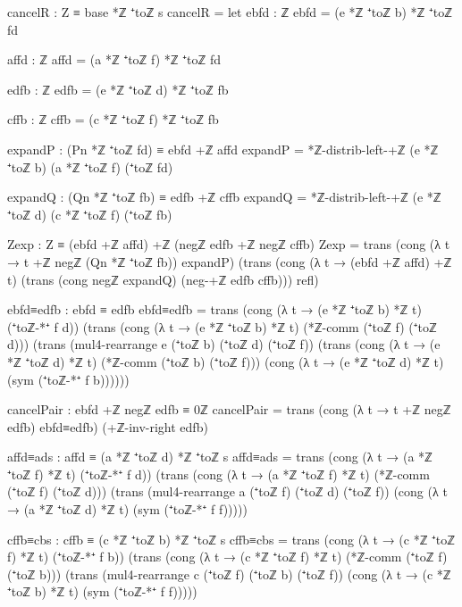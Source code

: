 \documentclass[11pt,a4paper]{book}
\begin{document}
\begin{code}
    cancelR : Z ≡ base *ℤ ⁺toℤ s
    cancelR =
      let
        ebfd : ℤ
        ebfd = (e *ℤ ⁺toℤ b) *ℤ ⁺toℤ fd

        affd : ℤ
        affd = (a *ℤ ⁺toℤ f) *ℤ ⁺toℤ fd

        edfb : ℤ
        edfb = (e *ℤ ⁺toℤ d) *ℤ ⁺toℤ fb

        cffb : ℤ
        cffb = (c *ℤ ⁺toℤ f) *ℤ ⁺toℤ fb

        expandP : (Pn *ℤ ⁺toℤ fd) ≡ ebfd +ℤ affd
        expandP = *ℤ-distrib-left-+ℤ (e *ℤ ⁺toℤ b) (a *ℤ ⁺toℤ f) (⁺toℤ fd)

        expandQ : (Qn *ℤ ⁺toℤ fb) ≡ edfb +ℤ cffb
        expandQ = *ℤ-distrib-left-+ℤ (e *ℤ ⁺toℤ d) (c *ℤ ⁺toℤ f) (⁺toℤ fb)

        Zexp : Z ≡ (ebfd +ℤ affd) +ℤ (negℤ edfb +ℤ negℤ cffb)
        Zexp =
          trans
            (cong (λ t → t +ℤ negℤ (Qn *ℤ ⁺toℤ fb)) expandP)
            (trans
              (cong (λ t → (ebfd +ℤ affd) +ℤ t) (trans (cong negℤ expandQ) (neg-+ℤ edfb cffb)))
              refl)

        ebfd≡edfb : ebfd ≡ edfb
        ebfd≡edfb =
          trans
            (cong (λ t → (e *ℤ ⁺toℤ b) *ℤ t) (⁺toℤ-*⁺ f d))
            (trans
              (cong (λ t → (e *ℤ ⁺toℤ b) *ℤ t) (*ℤ-comm (⁺toℤ f) (⁺toℤ d)))
              (trans
                (mul4-rearrange e (⁺toℤ b) (⁺toℤ d) (⁺toℤ f))
                (trans
                  (cong (λ t → (e *ℤ ⁺toℤ d) *ℤ t) (*ℤ-comm (⁺toℤ b) (⁺toℤ f)))
                  (cong (λ t → (e *ℤ ⁺toℤ d) *ℤ t) (sym (⁺toℤ-*⁺ f b))))))

        cancelPair : ebfd +ℤ negℤ edfb ≡ 0ℤ
        cancelPair =
          trans
            (cong (λ t → t +ℤ negℤ edfb) ebfd≡edfb)
            (+ℤ-inv-right edfb)

        affd≡ads : affd ≡ (a *ℤ ⁺toℤ d) *ℤ ⁺toℤ s
        affd≡ads =
          trans
            (cong (λ t → (a *ℤ ⁺toℤ f) *ℤ t) (⁺toℤ-*⁺ f d))
            (trans
              (cong (λ t → (a *ℤ ⁺toℤ f) *ℤ t) (*ℤ-comm (⁺toℤ f) (⁺toℤ d)))
              (trans
                (mul4-rearrange a (⁺toℤ f) (⁺toℤ d) (⁺toℤ f))
                (cong (λ t → (a *ℤ ⁺toℤ d) *ℤ t) (sym (⁺toℤ-*⁺ f f)))))

        cffb≡cbs : cffb ≡ (c *ℤ ⁺toℤ b) *ℤ ⁺toℤ s
        cffb≡cbs =
          trans
            (cong (λ t → (c *ℤ ⁺toℤ f) *ℤ t) (⁺toℤ-*⁺ f b))
            (trans
              (cong (λ t → (c *ℤ ⁺toℤ f) *ℤ t) (*ℤ-comm (⁺toℤ f) (⁺toℤ b)))
              (trans
                (mul4-rearrange c (⁺toℤ f) (⁺toℤ b) (⁺toℤ f))
                (cong (λ t → (c *ℤ ⁺toℤ b) *ℤ t) (sym (⁺toℤ-*⁺ f f)))))


\end{code}
\end{document}
